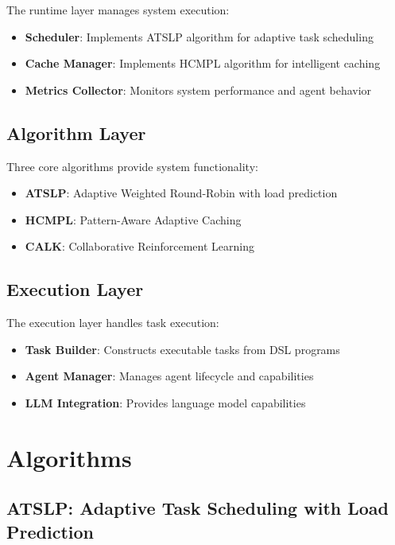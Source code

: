 \documentclass[conference]{IEEEtran}
\begin{document}
The runtime layer manages system execution:

\begin{itemize}
\item \textbf{Scheduler}: Implements ATSLP algorithm for adaptive task scheduling
\item \textbf{Cache Manager}: Implements HCMPL algorithm for intelligent caching
\item \textbf{Metrics Collector}: Monitors system performance and agent behavior
\end{itemize}

\subsection{Algorithm Layer}

Three core algorithms provide system functionality:

\begin{itemize}
\item \textbf{ATSLP}: Adaptive Weighted Round-Robin with load prediction
\item \textbf{HCMPL}: Pattern-Aware Adaptive Caching
\item \textbf{CALK}: Collaborative Reinforcement Learning
\end{itemize}

\subsection{Execution Layer}

The execution layer handles task execution:

\begin{itemize}
\item \textbf{Task Builder}: Constructs executable tasks from DSL programs
\item \textbf{Agent Manager}: Manages agent lifecycle and capabilities
\item \textbf{LLM Integration}: Provides language model capabilities
\end{itemize}

\section{Algorithms}

\subsection{ATSLP: Adaptive Task Scheduling with Load Prediction}
\end{document}
